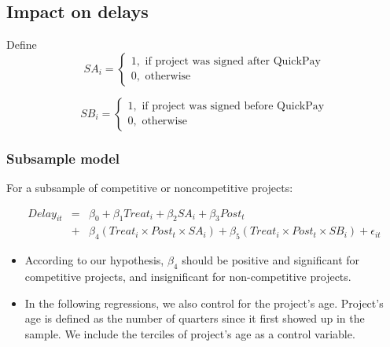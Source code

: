 \documentclass[]{article}
\providecommand{\tightlist}{%
  \setlength{\itemsep}{0pt}\setlength{\parskip}{0pt}}
\begin{document}
\hypertarget{impact-on-delays}{%
\subsection{Impact on delays}\label{impact-on-delays}}

Define
\[ SA_i = \begin{cases} 1, \text{ if project was signed after QuickPay}\\
0, \text{ otherwise} \end{cases}\]

\[ SB_i = \begin{cases} 1, \text{ if project was signed before QuickPay}\\
0, \text{ otherwise} \end{cases}\]

\hypertarget{subsample-model}{%
\subsubsection{Subsample model}\label{subsample-model}}

For a subsample of competitive or noncompetitive projects:

\[ \begin{aligned} Delay_{it} &=& \beta_0 +\beta_1 Treat_i+ \beta_2 SA_i+ \beta_3 Post_t \\&+& \beta_4 (Treat_i \times Post_t \times SA_i )+\beta_5 (Treat_i \times Post_t \times SB_i )+\epsilon_{it} \end{aligned} \]

\begin{itemize}
\tightlist
\item
  According to our hypothesis, \(\beta_4\) should be positive and
  significant for competitive projects, and insignificant for
  non-competitive projects.
\item
  In the following regressions, we also control for the project's age.
  Project's age is defined as the number of quarters since it first
  showed up in the sample. We include the terciles of project's age as a
  control variable.
\end{itemize}
\end{document}
